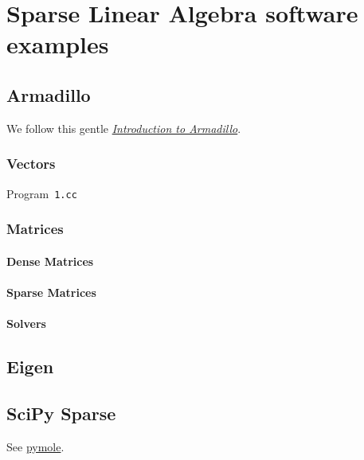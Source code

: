 \chapter{Sparse Linear Algebra software examples}

\section{Armadillo}

We follow this gentle
\href{https://anderkve.github.io/FYS3150/book/introduction_to_cpp/intro_to_armadillo.html}{\emph{Introduction to Armadillo}}.

\subsection{Vectors}

\begin{listing}[ht!]
	\tiny
	\centering
	\caption{Program~\texttt{1.cc}}
	\label{code:1.m}
\end{listing}

\subsection{Matrices}

\subsubsection{Dense Matrices}

\subsubsection{Sparse Matrices}

\subsubsection{Solvers}

\section{Eigen}

\section{SciPy Sparse}

See \href{https://github.com/nutrik/pymole}{pymole}.

